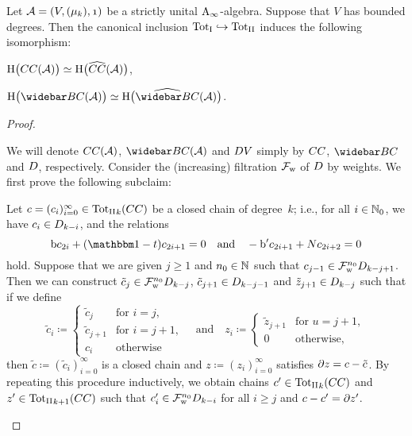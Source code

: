 \documentclass[\MainFolder/Text.tex]{subfiles}
\begin{document}
\begin{Lemma} \label{Lem:BddDegrees}
Let $\Alg=(V,(\mu_k),\NOne)$ be a strictly unital $\mathrm{A}_\infty$-algebra. Suppose that $V$ has bounded degrees. Then the canonical inclusion ${\mathrm{Tot}_{\mathrm{I}}} \hookrightarrow {\mathrm{Tot}_{\mathrm{II}}}$ induces the following isomorphism: 
\begin{ClaimList}
\item $\mathrm{H}\bigl(CC(\mathcal{A})\bigr) \simeq \mathrm{H}\bigl(\widehat{CC}(\mathcal{A})\bigr)$,
\item $\H\bigl(\NConCycBi(\Alg)\bigr) \simeq \H\bigl(\widehat{\NConCycBi}(\Alg)\bigr)$.
\end{ClaimList} 
\end{Lemma}
\begin{proof}
\begin{ProofList}
\item We will denote $CC(\mathcal{A})$, $\NConCycBi(\Alg)$ and $D V$ simply by $CC$, $\NConCycBi$ and $D$, respectively. Consider the (increasing) filtration $\mathcal{F}_{\mathrm{w}}$ of $D$ by weights. We first prove the following subclaim:
\begin{SubClaim}\label{SubClaim:LodCycBi}
Let $c = (c_i)_{i=0}^\infty\in {{\mathrm{Tot}_{\mathrm{II}}}}_k(CC)$ be a closed chain of degree~$k$; i.e., for all $i\in\mathbb{N}_0$, we have $c_i \in D_{k-i}$, and the relations
$$ \Hd c_{2i} + (\Id-\CycPermOp)c_{2i+1} = 0 \quad\text{and}\quad -\Hd' c_{2i+1} + \CountOp c_{2i+2} = 0$$
hold. Suppose that we are given $j\ge 1$ and $n_0\in \mathbb{N}$ such that $c_{j-1}\in \mathcal{F}^{n_0}_{\mathrm{w}} D_{k-j+1}$. Then we can construct $\tilde{c}_j\in \mathcal{F}^{n_0}_{\mathrm{w}}D_{k-j}$, $\tilde{c}_{j+1}\in D_{k-j-1}$ and $\tilde{z}_{j+1}\in D_{k-j}$ such that if we define
\begin{equation}\label{Eq:DefOfChains}
\tilde{c}_i \coloneqq \begin{cases}
    \tilde{c}_j & \text{for } i=j, \\
    \tilde{c}_{j+1} & \text{for } i=j+1, \\
    c_i & \text{otherwise}
\end{cases}\quad\text{and}\quad z_i \coloneqq \begin{cases} 
\tilde{z}_{j+1} & \text{for }u = j+ 1,\\
0 & \text{otherwise},
\end{cases}
\end{equation}
then $\tilde{c}\coloneqq (\tilde{c}_i)_{i=0}^\infty$ is a closed chain and $z\coloneqq(z_i)_{i=0}^\infty$ satisfies $\partial z = c - \tilde{c}$. By repeating this procedure inductively, we obtain chains $c'\in{\mathrm{Tot}_{\mathrm{II}}}_k(CC)$ and $z'\in {\mathrm{Tot}_{\mathrm{II}}}_{k+1}(CC)$ such that $c'_i \in \mathcal{F}^{n_0}_{\mathrm{w}}D_{k-i}$ for all $i\ge j$ and $c-c' = \partial z'$.

\end{SubClaim}
\end{ProofList}
\end{proof}
\end{document}
